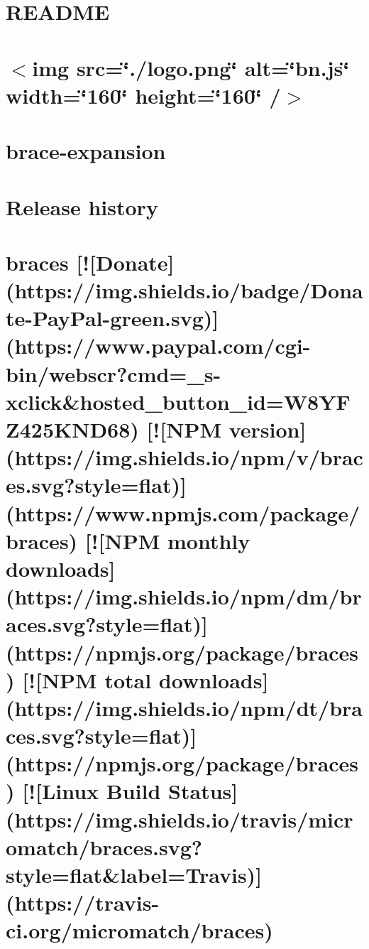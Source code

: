 \documentclass[twoside]{book}
\newcommand{\+}{\discretionary{\mbox{\scriptsize$\hookleftarrow$}}{}{}}
\begin{document}
\chapter{R\+E\+A\+D\+ME}
\label{md_dsmacc_examples_DRmerge_node_modules_bluebird_README}

\chapter{$<$img src=\char`\"{}./logo.\+png\char`\"{} alt=\char`\"{}bn.\+js\char`\"{} width=\char`\"{}160\char`\"{} height=\char`\"{}160\char`\"{} /$>$}
\label{md_dsmacc_examples_DRmerge_node_modules_bn_8js_README}

\chapter{brace-\/expansion}
\label{md_dsmacc_examples_DRmerge_node_modules_brace-expansion_README}

\chapter{Release history}
\label{md_dsmacc_examples_DRmerge_node_modules_braces_CHANGELOG}

\chapter{braces \mbox{[}!\mbox{[}Donate\mbox{]}(https\+://img.shields.\+io/badge/\+Donate-\/\+Pay\+Pal-\/green.svg)\mbox{]}(https\+://www.paypal.\+com/cgi-\/bin/webscr?cmd=\+\_\+s-\/xclick\&hosted\+\_\+button\+\_\+id=W8\+Y\+F\+Z425\+K\+N\+D68) \mbox{[}!\mbox{[}N\+PM version\mbox{]}(https\+://img.shields.\+io/npm/v/braces.svg?style=flat)\mbox{]}(https\+://www.npmjs.\+com/package/braces) \mbox{[}!\mbox{[}N\+PM monthly downloads\mbox{]}(https\+://img.shields.\+io/npm/dm/braces.svg?style=flat)\mbox{]}(https\+://npmjs.org/package/braces) \mbox{[}!\mbox{[}N\+PM total downloads\mbox{]}(https\+://img.shields.\+io/npm/dt/braces.svg?style=flat)\mbox{]}(https\+://npmjs.org/package/braces) \mbox{[}!\mbox{[}Linux Build Status\mbox{]}(https\+://img.shields.\+io/travis/micromatch/braces.svg?style=flat\&label=Travis)\mbox{]}(https\+://travis-\/ci.org/micromatch/braces)}
\label{md_dsmacc_examples_DRmerge_node_modules_braces_README}

\end{document}
